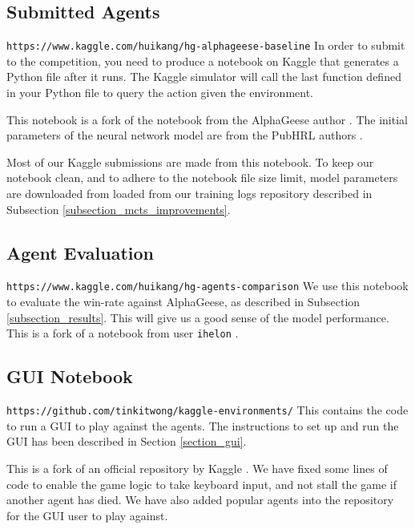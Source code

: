 \subsection{Submitted Agents}
\label{subsection_submission}

\verb|https://www.kaggle.com/huikang/hg-alphageese-baseline|\newline\newline
In order to submit to the competition, you need to produce a notebook on Kaggle that generates a Python file after it runs. The Kaggle simulator will call the last function defined in your Python file to query the action given the environment.

This notebook is a fork of the notebook from the AlphaGeese author \cite{notebook_alphageese_baseline}. The initial parameters of the neural network model are from the PubHRL authors \cite{notebook_pubhrl}.

Most of our Kaggle submissions are made from this notebook. To keep our notebook clean, and to adhere to the notebook file size limit, model parameters are downloaded from loaded from our training logs repository described in Subsection \ref{subsection_mcts_improvements}.


\subsection{Agent Evaluation}
\label{subsection_evaluation}

\verb|https://www.kaggle.com/huikang/hg-agents-comparison|\newline\newline
We use this notebook to evaluate the win-rate against AlphaGeese, as described in Subsection \ref{subsection_results}. This will give us a good sense of the model performance. This is a fork of a notebook from user \verb|ihelon| \cite{notebook_agents_comparison}.


\subsection{GUI Notebook}
\label{subsection_gui_notebook}

\verb|https://github.com/tinkitwong/kaggle-environments/|\newline\newline
This contains the code to run a GUI to play against the agents. The instructions to set up and run the GUI has been described in Section \ref{section_gui}. 

This is a fork of an official repository by Kaggle \cite{repo_kaggle_environments}. We have fixed some lines of code to enable the game logic to take keyboard input, and not stall the game if another agent has died. We have also added popular agents \cite{notebook_agents_comparison} into the repository for the GUI user to play against.